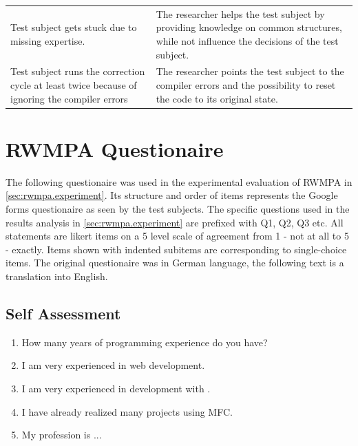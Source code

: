 \begin{appendix}
\begin{longtable}[h]{@{}ll@{}}
\begin{minipage}[t]{0.47\columnwidth}
Test subject gets stuck due to missing expertise.\strut
\end{minipage} & \begin{minipage}[t]{0.47\columnwidth}\raggedright
The researcher helps the test subject by providing knowledge on common structures, while not influence the decisions of the test subject.\strut
\end{minipage}\tabularnewline
\begin{minipage}[t]{0.47\columnwidth}\raggedright
Test subject runs the correction cycle at least twice because of ignoring the compiler errors\strut
\end{minipage} & \begin{minipage}[t]{0.47\columnwidth}\raggedright
The researcher points the test subject to the compiler errors and the possibility to reset the code to its original state.\strut
\end{minipage}\tabularnewline
\bottomrule
\end{longtable}

\vspace{-15pt}
\section{RWMPA Questionaire\label{sec:rwmpa-questionaire}}
\vspace{15pt}

The following questionaire was used in the experimental evaluation of RWMPA in \cref{sec:rwmpa.experiment}. 
Its structure and order of items represents the Google forms questionaire as seen by the test subjects. 
The specific questions used in the results analysis in \cref{sec:rwmpa.experiment} are prefixed with Q1, Q2, Q3 etc. All statements are likert items on a 5 level scale of agreement from 1 - not at all to 5 - exactly. 
Items shown with indented subitems are corresponding to single-choice items.
The original questionaire was in German language, the following text is a translation into English.

\subsection*{Self Assessment}
\begin{enumerate}
\item How many years of programming experience do you have?
\item I am very experienced in web development.
\item I am very experienced in development with \cpp.
\item I have already realized many projects using MFC.
\item My profession is ...
\end{enumerate}


\end{appendix}
